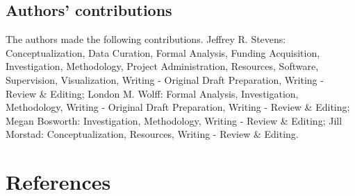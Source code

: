 \documentclass[
  english,
  ,pub,floatsintext]{apa6}
\begin{document}
\hypertarget{authors-contributions}{%
\subsection{Authors' contributions}\label{authors-contributions}}

The authors made the following contributions. Jeffrey R. Stevens: Conceptualization, Data Curation, Formal Analysis, Funding Acquisition, Investigation, Methodology, Project Administration, Resources, Software, Supervision, Visualization, Writing - Original Draft Preparation, Writing - Review \& Editing;
London M. Wolff: Formal Analysis, Investigation, Methodology, Writing - Original Draft Preparation, Writing - Review \& Editing;
Megan Bosworth: Investigation, Methodology, Writing - Review \& Editing;
Jill Morstad: Conceptualization, Resources, Writing - Review \& Editing.

\hypertarget{references}{%
\section*{References}\label{references}}
\end{document}
